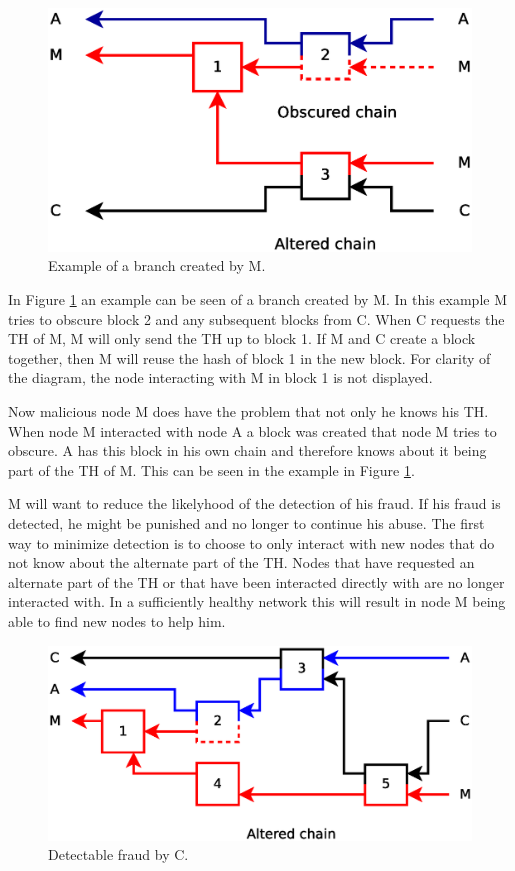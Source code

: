 \begin{figure}
	\centerline{\includegraphics[scale=0.3]{problems/figs/branch.eps}}
	\caption{Example of a branch created by M.}
	\label{fig:problem-branch-obscure}
\end{figure}

In Figure \ref{fig:problem-branch-obscure} an example can be seen of a branch created by M.
In this example M tries to obscure block 2 and any subsequent blocks from C.
When C requests the TH of M, M will only send the TH up to block 1.
If M and C create a block together,
then M will reuse the hash of block 1 in the new block.
For clarity of the diagram, the node interacting with M in block 1 is not displayed.

Now malicious node M does have the problem that not only he knows his TH.
When node M interacted with node A a block was created that node M tries to obscure.
A has this block in his own chain
and therefore knows about it being part of the TH of M.
This can be seen in the example in Figure \ref{fig:problem-branch-obscure}.

M will want to reduce the likelyhood of the detection of his fraud.
If his fraud is detected, he might be punished and no longer to continue his abuse.
The first way to minimize detection is to choose
to only interact with new nodes that do not know about the alternate part of the TH.
Nodes that have requested an alternate part of the TH
or that have been interacted directly with are no longer interacted with.
In a sufficiently healthy network this will result in node M being able to find new nodes to help him.

\begin{figure}
	\centerline{\includegraphics[scale=0.3]{problems/figs/branch-fraud-detected.eps}}
	\caption{Detectable fraud by C.}
	\label{fig:problem-branch-preknowledge}
\end{figure}

